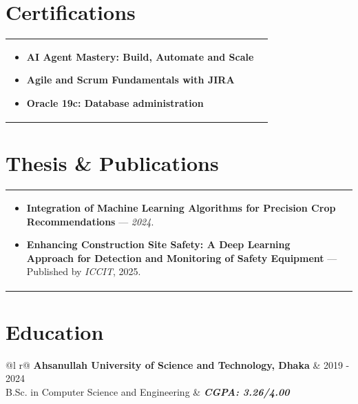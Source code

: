 \documentclass[a4paper,8pt]{article}
\begin{document}
\section{Certifications}
\begin{tabularx}{\linewidth}{ @{}l r@{} }
\begin{minipage}[t]{\linewidth}
\begin{itemize}[nosep,after=\strut, leftmargin=2em, itemsep=4pt]

\item \textbf{AI Agent Mastery: Build, Automate and Scale}
\item \textbf{Agile and Scrum Fundamentals with JIRA} 
\item \textbf{Oracle 19c: Database administration}  

\end{itemize}
\end{minipage}
\end{tabularx}




\section{Thesis \& Publications}
\begin{tabularx}{\linewidth}{ @{}l r@{} }
\begin{minipage}[t]{\linewidth}
\begin{itemize}[nosep, after=\strut, leftmargin=2em, itemsep=2pt]
\item \textbf{Integration of Machine Learning Algorithms for Precision Crop Recommendations} — \textit{2024}.
\item \textbf{Enhancing Construction Site Safety: A Deep Learning Approach for Detection and Monitoring of Safety 
Equipment} — Published by \textit{ICCIT}, {2025}.
\end{itemize}
\end{minipage}
\end{tabularx}

\vspace{2pt} %

\section{Education}
\begin{tabularx}{\linewidth}{ @{}l r@{} }
\color[HTML]{1C033C} \textbf{Ahsanullah University of Science and Technology, Dhaka} & \hfill \color[HTML]{371e77} 2019 - 2024 \\
\color[HTML]{371e77} B.Sc. in Computer Science and Engineering & \hfill \color[HTML]{4B28A4} \textit{\textbf{CGPA: 3.26/4.00}} \\

\end{tabularx}\\[2pt]
\end{document}
